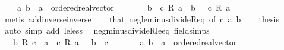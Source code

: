 \begin{isabellebody}
\ \ \ \ a\ b\ {\isacharcolon}{\kern0pt}{\isacharcolon}{\kern0pt}\ {\isachardoublequoteopen}{\isacharprime}{\kern0pt}a\ {\isacharcolon}{\kern0pt}{\isacharcolon}{\kern0pt}\ ordered{\isacharunderscore}{\kern0pt}real{\isacharunderscore}{\kern0pt}vector{\isachardoublequoteclose}\isanewline
%
\isadelimproof
%
\endisadelimproof
%
\isatagproof
{}\isamarkupfalse%
\ {\isacharminus}{\kern0pt}\isanewline
\ \ \isamarkupfalse%
\ {\isacharasterisk}{\kern0pt}{\isacharcolon}{\kern0pt}\ {\isachardoublequoteopen}{\isacharminus}{\kern0pt}\ b\ {\isacharequal}{\kern0pt}\ c\ {\isacharasterisk}{\kern0pt}\isactrlsub R\ a\ {\isasymlongleftrightarrow}\ b\ {\isacharequal}{\kern0pt}\ {\isacharminus}{\kern0pt}\ {\isacharparenleft}{\kern0pt}c\ {\isacharasterisk}{\kern0pt}\isactrlsub R\ a{\isacharparenright}{\kern0pt}{\isachardoublequoteclose}\isanewline
\ \ \ \ \isamarkupfalse%
\ {\isacharparenleft}{\kern0pt}metis\ add{\isachardot}{\kern0pt}inverse{\isacharunderscore}{\kern0pt}inverse{\isacharparenright}{\kern0pt}\isanewline
\ \ \isamarkupfalse%
\ that\ neg{\isacharunderscore}{\kern0pt}le{\isacharunderscore}{\kern0pt}minus{\isacharunderscore}{\kern0pt}divideR{\isacharunderscore}{\kern0pt}eq\ {\isacharbrackleft}{\kern0pt}of\ c\ a\ b{\isacharbrackright}{\kern0pt}\isanewline
\ \ \isamarkupfalse%
\ {\isacharquery}{\kern0pt}thesis\ \isamarkupfalse%
\ {\isacharparenleft}{\kern0pt}auto\ simp\ add{\isacharcolon}{\kern0pt}\ le{\isacharunderscore}{\kern0pt}less\ {\isacharasterisk}{\kern0pt}{\isacharparenright}{\kern0pt}\isanewline
{}\isamarkupfalse%
%
\endisatagproof
{\isafoldproof}%
%
\isadelimproof
\isanewline
%
\endisadelimproof
\isanewline
{}\isamarkupfalse%
\ neg{\isacharunderscore}{\kern0pt}minus{\isacharunderscore}{\kern0pt}divideR{\isacharunderscore}{\kern0pt}le{\isacharunderscore}{\kern0pt}eq\ {\isacharbrackleft}{\kern0pt}field{\isacharunderscore}{\kern0pt}simps{\isacharbrackright}{\kern0pt}{\isacharcolon}{\kern0pt}\isanewline
\ \ {\isachardoublequoteopen}{\isacharminus}{\kern0pt}\ {\isacharparenleft}{\kern0pt}b\ {\isacharslash}{\kern0pt}\isactrlsub R\ c{\isacharparenright}{\kern0pt}\ {\isasymle}\ a\ {\isasymlongleftrightarrow}\ c\ {\isacharasterisk}{\kern0pt}\isactrlsub R\ a\ {\isasymle}\ {\isacharminus}{\kern0pt}\ b{\isachardoublequoteclose}\ \ {\isachardoublequoteopen}c\ {\isacharless}{\kern0pt}\ {}{\isachardoublequoteclose}\isanewline
\ \ \ \ \ a\ b\ {\isacharcolon}{\kern0pt}{\isacharcolon}{\kern0pt}\ {\isachardoublequoteopen}{\isacharprime}{\kern0pt}a\ {\isacharcolon}{\kern0pt}{\isacharcolon}{\kern0pt}\ ordered{\isacharunderscore}{\kern0pt}real{\isacharunderscore}{\kern0pt}vector{\isachardoublequoteclose}\isanewline

\end{isabellebody}
